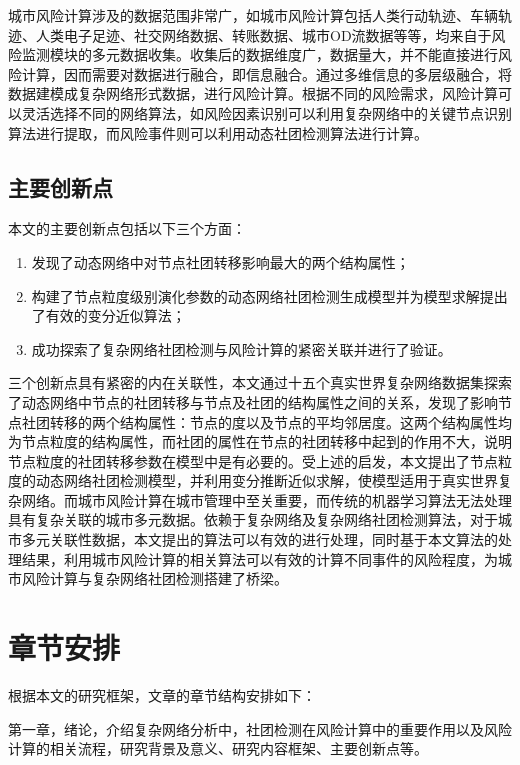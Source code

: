 城市风险计算涉及的数据范围非常广，如城市风险计算包括人类行动轨迹、车辆轨迹、人类电子足迹、社交网络数据、转账数据、城市OD流数据等等，均来自于风险监测模块的多元数据收集。收集后的数据维度广，数据量大，并不能直接进行风险计算，因而需要对数据进行融合，即信息融合。通过多维信息的多层级融合，将数据建模成复杂网络形式数据，进行风险计算。根据不同的风险需求，风险计算可以灵活选择不同的网络算法，如风险因素识别可以利用复杂网络中的关键节点识别算法进行提取，而风险事件则可以利用动态社团检测算法进行计算。

\subsection{主要创新点}

本文的主要创新点包括以下三个方面：

\begin{enumerate}
	\item 发现了动态网络中对节点社团转移影响最大的两个结构属性；
	\item 构建了节点粒度级别演化参数的动态网络社团检测生成模型并为模型求解提出了有效的变分近似算法；
	\item 成功探索了复杂网络社团检测与风险计算的紧密关联并进行了验证。
\end{enumerate}

三个创新点具有紧密的内在关联性，本文通过十五个真实世界复杂网络数据集探索了动态网络中节点的社团转移与节点及社团的结构属性之间的关系，发现了影响节点社团转移的两个结构属性：节点的度以及节点的平均邻居度。这两个结构属性均为节点粒度的结构属性，而社团的属性在节点的社团转移中起到的作用不大，说明节点粒度的社团转移参数在模型中是有必要的。受上述的启发，本文提出了节点粒度的动态网络社团检测模型，并利用变分推断近似求解，使模型适用于真实世界复杂网络。而城市风险计算在城市管理中至关重要，而传统的机器学习算法无法处理具有复杂关联的城市多元数据。依赖于复杂网络及复杂网络社团检测算法，对于城市多元关联性数据，本文提出的算法可以有效的进行处理，同时基于本文算法的处理结果，利用城市风险计算的相关算法可以有效的计算不同事件的风险程度，为城市风险计算与复杂网络社团检测搭建了桥梁。


\section{章节安排}


根据本文的研究框架，文章的章节结构安排如下：

第一章，绪论，介绍复杂网络分析中，社团检测在风险计算中的重要作用以及风险计算的相关流程，研究背景及意义、研究内容框架、主要创新点等。

